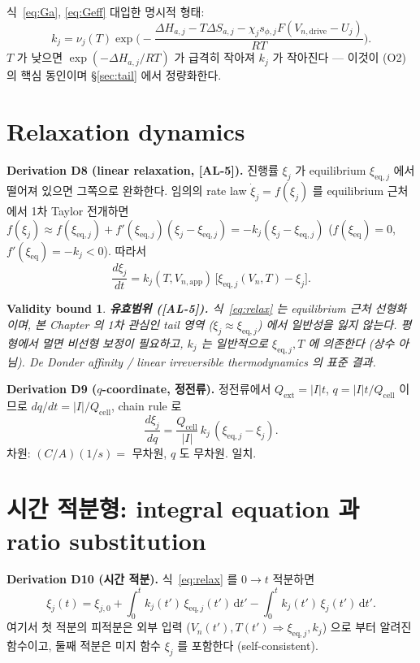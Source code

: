 \documentclass[11pt,a4paper]{article}
\newtheorem*{boundbox}{Validity bound}
\newcommand{\dd}{\mathrm{d}}
\newcommand{\eq}{\mathrm{eq}}
\newcommand{\app}{\mathrm{app}}
\newcommand{\dimedrive}{\mathrm{drive}}
\newcommand{\cell}{\mathrm{cell}}
\newcommand{\ext}{\mathrm{ext}}
\newcommand{\AL}[1]{\textsf{[AL-#1]}}
\begin{document}
식~\eqref{eq:Ga}, \eqref{eq:Geff} 대입한 명시적 형태:
\begin{equation}
k_j = \nu_j(T)\exp\!\Big(-\frac{\Delta H_{a,j}-T\Delta S_{a,j}-\chi_j s_{\phi,j}F(V_{n,\dimedrive}-U_j)}{RT}\Big).
\label{eq:rate_explicit}
\end{equation}
$T$ 가 낮으면 $\exp(-\Delta H_{a,j}/RT)$ 가 급격히 작아져 $k_j$ 가 작아진다 — 이것이
(O2) 의 핵심 동인이며 \S\ref{sec:tail} 에서 정량화한다.

\section{Relaxation dynamics}\label{sec:kinetics}
\textbf{Derivation D8 (linear relaxation, \AL{5}).} 진행률 $\xi_j$ 가 equilibrium
$\xi_{\eq,j}$ 에서 떨어져 있으면 그쪽으로 완화한다. 임의의 rate law $\dot\xi_j=f(\xi_j)$
를 equilibrium 근처에서 1차 Taylor 전개하면 $f(\xi_j)\approx f(\xi_{\eq,j})+f'(\xi_{\eq,j})
(\xi_j-\xi_{\eq,j})=-k_j(\xi_j-\xi_{\eq,j})$ ($f(\xi_\eq)=0$, $f'(\xi_\eq)=-k_j<0$).
따라서
\begin{equation}
\boxed{\;\frac{d\xi_j}{dt} = k_j(T,V_{n,\app})\,\big[\xi_{\eq,j}(V_n,T)-\xi_j\big].\;}
\label{eq:relax}
\end{equation}
\begin{boundbox}
\textbf{유효범위 (\AL{5}).} 식~\eqref{eq:relax} 는 \emph{equilibrium 근처} 선형화이며,
본 Chapter 의 1차 관심인 tail 영역 ($\xi_j\approx\xi_{\eq,j}$) 에서 일반성을 잃지
않는다. 평형에서 멀면 비선형 보정이 필요하고, $k_j$ 는 일반적으로 $\xi_{\eq,j},T$ 에
의존한다 (상수 아님). De Donder affinity / linear irreversible thermodynamics
\cite{degrootmazur1962,onsager1931} 의 표준 결과.
\end{boundbox}

\textbf{Derivation D9 ($q$-coordinate, 정전류).} 정전류에서 $Q_\ext=|I|t$, $q=|I|t/Q_\cell$
이므로 $dq/dt=|I|/Q_\cell$, chain rule 로
\begin{equation}
\frac{d\xi_j}{dq} = \frac{Q_\cell}{|I|}\,k_j\,(\xi_{\eq,j}-\xi_j).
\label{eq:dxi_dq}
\end{equation}
차원: $(C/A)(1/s)=$ 무차원, $q$ 도 무차원. 일치.

\section{시간 적분형: integral equation 과 ratio substitution}\label{sec:integral}
\textbf{Derivation D10 (시간 적분).} 식~\eqref{eq:relax} 를 $0\to t$ 적분하면
\begin{equation}
\xi_j(t) = \xi_{j,0} + \int_0^t k_j(t')\,\xi_{\eq,j}(t')\,\dd t' - \int_0^t k_j(t')\,\xi_j(t')\,\dd t'.
\label{eq:volterra}
\end{equation}
여기서 첫 적분의 피적분은 외부 입력 ($V_n(t'),T(t')\Rightarrow\xi_{\eq,j},k_j$) 으로
부터 알려진 함수이고, 둘째 적분은 미지 함수 $\xi_j$ 를 포함한다 (self-consistent).
\end{document}
